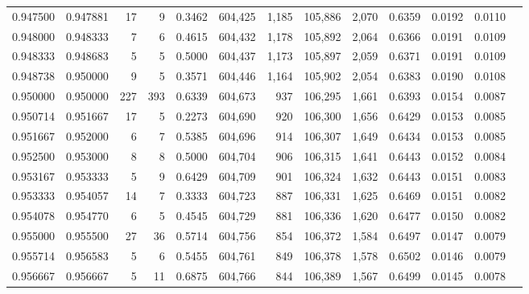 \begin{tabular}{rrrrrrrrrrrrr}
0.947500 & 0.947881 &    17 &   9 &                                     0.3462 & 604,425 &   1,185 & 105,886 &   2,070 & 0.6359 & 0.0192 & 0.0110 \\
0.948000 & 0.948333 &     7 &   6 &                                     0.4615 & 604,432 &   1,178 & 105,892 &   2,064 & 0.6366 & 0.0191 & 0.0109 \\
0.948333 & 0.948683 &     5 &   5 &                                     0.5000 & 604,437 &   1,173 & 105,897 &   2,059 & 0.6371 & 0.0191 & 0.0109 \\
0.948738 & 0.950000 &     9 &   5 &                                     0.3571 & 604,446 &   1,164 & 105,902 &   2,054 & 0.6383 & 0.0190 & 0.0108 \\
0.950000 & 0.950000 &   227 & 393 &                                     0.6339 & 604,673 &     937 & 106,295 &   1,661 & 0.6393 & 0.0154 & 0.0087 \\
0.950714 & 0.951667 &    17 &   5 &                                     0.2273 & 604,690 &     920 & 106,300 &   1,656 & 0.6429 & 0.0153 & 0.0085 \\
0.951667 & 0.952000 &     6 &   7 &                                     0.5385 & 604,696 &     914 & 106,307 &   1,649 & 0.6434 & 0.0153 & 0.0085 \\
0.952500 & 0.953000 &     8 &   8 &                                     0.5000 & 604,704 &     906 & 106,315 &   1,641 & 0.6443 & 0.0152 & 0.0084 \\
0.953167 & 0.953333 &     5 &   9 &                                     0.6429 & 604,709 &     901 & 106,324 &   1,632 & 0.6443 & 0.0151 & 0.0083 \\
0.953333 & 0.954057 &    14 &   7 &                                     0.3333 & 604,723 &     887 & 106,331 &   1,625 & 0.6469 & 0.0151 & 0.0082 \\
0.954078 & 0.954770 &     6 &   5 &                                     0.4545 & 604,729 &     881 & 106,336 &   1,620 & 0.6477 & 0.0150 & 0.0082 \\
0.955000 & 0.955500 &    27 &  36 &                                     0.5714 & 604,756 &     854 & 106,372 &   1,584 & 0.6497 & 0.0147 & 0.0079 \\
0.955714 & 0.956583 &     5 &   6 &                                     0.5455 & 604,761 &     849 & 106,378 &   1,578 & 0.6502 & 0.0146 & 0.0079 \\
0.956667 & 0.956667 &     5 &  11 &                                     0.6875 & 604,766 &     844 & 106,389 &   1,567 & 0.6499 & 0.0145 & 0.0078 \\

\end{tabular}
